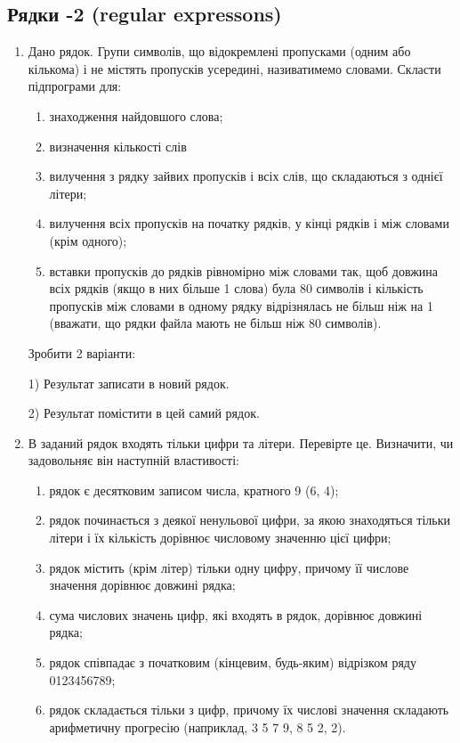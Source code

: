 \documentclass[]{article}
\makeatletter
\newcommand{\xslalph}[1]{\expandafter\@xslalph\csname c@#1\endcsname}
\newcommand{\@xslalph}[1]{%
    \ifcase#1\or а\or б\or в\or г\or д\or e\or є\or ж\or з\or i%
    \or й\or к\or л\or м\or н\or о\or п\or р\or с\or т%
    \or у\or ф\or х\or ц\or ч\or ш\or ю\or я\or аа\or бб\or вв %
    \else\@ctrerr\fi%
}
\makeatother
\begin{document}
\subsection{Рядки -2 (regular expressons)}
\begin{enumerate}
\def\labelenumi{\arabic{enumi}.}
 
\item  Дано рядок. Групи символів, що відокремлені пропусками (одним  або  кількома)  і  не містять  пропусків  усередині,  називатимемо словами. Скласти підпрограми для: 
\begin{enumerate}[label=\xslalph*)]
\item знаходження найдовшого слова; 
\item визначення кількості слів 
\item вилучення з рядку зайвих пропусків і всіх слів, що складаються з однієї літери; 
\item вилучення всіх пропусків на початку рядків, у кінці рядків і між словами (крім одного); 
\item вставки пропусків до рядків рівномірно між словами так, щоб довжина всіх рядків (якщо в них більше 1 слова) була 80 символів і кількість пропусків між  словами  в  одному  рядку  відрізнялась  не  більш  ніж  на  1 
(вважати, що рядки файла мають не більш ніж 80 символів). 
\end{enumerate}

Зробити 2 варіанти: 

1) Результат записати в новий рядок.

2) Результат помістити в цей самий рядок.


\item  В заданий рядок входять тільки цифри та літери. Перевірте це. Визначити, чи задовольняє він наступній властивості:
\begin{enumerate}[label=\xslalph*)]
\item рядок є десятковим записом числа, кратного 9 (6, 4);
\item рядок починається з деякої ненульової цифри, за якою знаходяться тільки літери і їх кількість дорівнює числовому значенню цієї цифри;
\item рядок містить (крім літер) тільки одну цифру, причому її числове значення дорівнює довжині рядка;
\item сума числових значень цифр, які входять в рядок, дорівнює довжині рядка;
\item рядок співпадає з початковим (кінцевим, будь-яким) відрізком ряду 0123456789;
\item рядок складається тільки з цифр, причому їх числові значення складають арифметичну прогресію (наприклад, 3 5 7 9, 8 5 2, 2).





\end{enumerate}
\end{enumerate}
\end{document}
